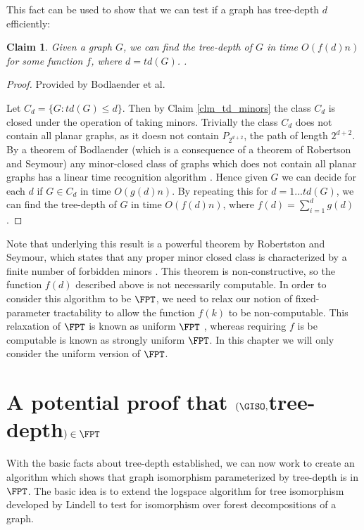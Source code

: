 \documentclass[11pt]{report}
\newtheorem{claim}{Claim}
\begin{document}
This fact can be used to show that we can test if a graph has tree-depth $d$ efficiently:


\begin{claim} Given a graph $G$, we can find the tree-depth of $G$ in time $O(f(d)n)$ for some function $f$, where $d=td(G)$. \cite{Bodlaender98}.
\label{clm_test_td_fpt}
\end{claim}
\begin{proof} Provided by Bodlaender et al. \cite{Bodlaender98}

Let $C_d=\{G: td(G)\leq d\}$. Then by Claim \ref{clm_td_minors} the class $C_d$ is closed under the operation of taking minors. Trivially the class $C_d$ does not contain all planar graphs, as it doesn not contain $P_{2^{d+2}}$, the path of length $2^{d+2}$. By a theorem of Bodlaender (which is a consequence of a theorem of Robertson and Seymour) any minor-closed class of graphs which does not contain all planar graphs has a linear time recognition algorithm \cite{Bodlaender93}. Hence given $G$ we can decide for each $d$ if $G\in C_d$ in time $O(g(d)n)$. By repeating this for $d=1$...$td(G)$, we can find the tree-depth of $G$ in time $O(f(d)n)$, where $f(d)=\displaystyle\sum\limits_{i=1}^{d} g(d)$.


\end{proof}

Note that underlying this result is a powerful theorem by Robertston and Seymour, which states that any proper minor closed class is characterized by a finite number of forbidden minors \cite{RobertsonSeymour}. This theorem is non-constructive, so the function $f(d)$ described above is not necessarily computable. In order to consider this algorithm to be $\FPT$, we need to relax our notion of fixed-parameter tractability to allow the function $f(k)$ to be non-computable. This relaxation of $\FPT$ is known as uniform $\FPT$ \cite{Downey95}, whereas requiring $f$ is be computable is known as strongly uniform $\FPT$. In this chapter we will only consider the uniform version of $\FPT$.







\section{A potential proof that $(\GISO ,$tree-depth$)\in\FPT$}


With the basic facts about tree-depth established, we can now work to create an algorithm which shows that graph isomorphism parameterized by tree-depth is in $\FPT$. The basic idea is to extend the logspace algorithm for tree isomorphism developed by Lindell \cite{Lindell92} to test for isomorphism over forest decompositions of a graph. 
\end{document}
